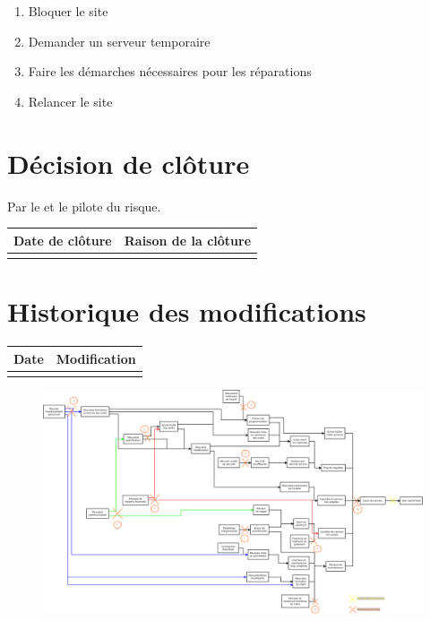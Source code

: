 \begin{enumerate}
	\item Bloquer le site
	\item Demander un serveur temporaire
	\item Faire les démarches nécessaires pour les réparations
	\item Relancer le site
\end{enumerate}

\section*{Décision de clôture}
Par le \CP{} et le pilote du risque.
\begin{table}[H]
\centering
	\begin{tabularx}{16.8cm}{|X|X|}
	\hline
	\rowcolor{gray!40} Date de clôture & Raison de la clôture \\
	\hline
	  & \\
	\hline
	\end{tabularx}
\end{table}

\section*{Historique des modifications}
\begin{table}[H]
\centering
	\begin{tabularx}{16.8cm}{|X|X|}
	\hline
	Date & Modification \\
	\hline
	  & \\
	\hline
	\end{tabularx}
\end{table}
\newpage

\begin{landscape}
\begin{figure}
	\centering
	\includegraphics[scale=0.35]{images/AnalyseRisque_nPourquoi_FDR001.png}
\end{figure}
\end{landscape}